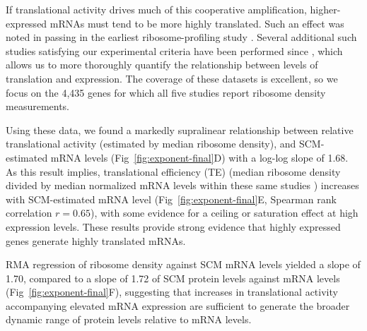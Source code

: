 \documentclass[10pt]{article}
\begin{document}
If translational activity drives much of this cooperative amplification, higher-expressed mRNAs must tend to be more highly translated. Such an effect was noted in passing in the earliest ribosome-profiling study \cite{ingolia09}. Several additional such studies satisfying our experimental criteria have been performed since \cite{gerashchenko12,Gerashchenko2014,McManus2014,Subtelny2014}, which allows us to more thoroughly quantify the relationship between levels of translation and expression. The coverage of these datasets is excellent, so we focus on the 4,435 genes for which all five studies report ribosome density measurements.

Using these data, we found a markedly supralinear relationship between relative translational activity (estimated by median ribosome density), and SCM-estimated mRNA levels (Fig~\ref{fig:exponent-final}D) with a log-log slope of 1.68. As this result implies, translational efficiency (TE) (median ribosome density divided by median normalized mRNA levels within these same studies \cite{ingolia09,gerashchenko12}) increases with SCM-estimated mRNA level (Fig~\ref{fig:exponent-final}E, Spearman rank correlation $r = 0.65$), with some evidence for a ceiling or saturation effect at high expression levels. These results provide strong evidence that highly expressed genes generate highly translated mRNAs.

RMA regression of ribosome density against SCM mRNA levels yielded a slope of 1.70, compared to a slope of 1.72 of SCM protein levels against mRNA levels (Fig~\ref{fig:exponent-final}F), suggesting that increases in translational activity accompanying elevated mRNA expression are sufficient to generate the broader dynamic range of protein levels relative to mRNA levels.
\end{document}
